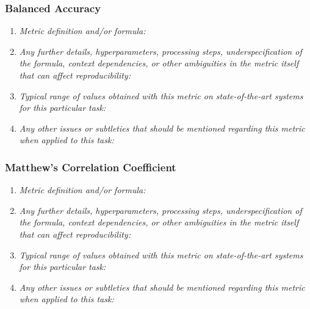 \documentclass[a4paper,11pt]{article}
\begin{document}
        \subsubsection{Balanced Accuracy}
            \begin{enumerate}[label=\alph*.]
                \item \textit{Metric definition and/or formula:}
                \bigskip
                \item \textit{Any further details, hyperparameters, processing steps, underspecification of the formula, context dependencies, or other ambiguities in the metric itself that can affect reproducibility:}
                \bigskip
                \item \textit{Typical range of values obtained with this metric on state-of-the-art systems for this particular task:}
                \bigskip
                \item \textit{Any other issues or subtleties that should be mentioned regarding this metric when applied to this task:}
                \bigskip
            \end{enumerate}
        \subsubsection{Matthew's Correlation Coefficient}
            \begin{enumerate}[label=\alph*.]
                \item \textit{Metric definition and/or formula:}
                \bigskip
                \item \textit{Any further details, hyperparameters, processing steps, underspecification of the formula, context dependencies, or other ambiguities in the metric itself that can affect reproducibility:}
                \bigskip
                \item \textit{Typical range of values obtained with this metric on state-of-the-art systems for this particular task:}
                \bigskip
                \item \textit{Any other issues or subtleties that should be mentioned regarding this metric when applied to this task:}
                \bigskip
            \end{enumerate}
\end{document}
